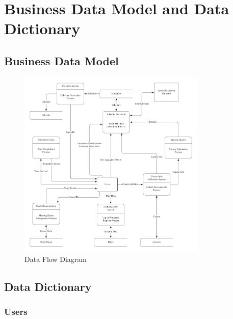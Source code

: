 \documentclass[12pt]{article}
\begin{document}
\section{Business Data Model and Data Dictionary}
\subsection{Business Data Model}
\begin{figure}[htbp]
  \centering
  \includegraphics[width=0.8\textwidth]{DFD.png}
  \caption{Data Flow Diagram} 
  \label{fig:dfd} 
\end{figure}

\subsection{Data Dictionary}
\subsubsection{Users}
\end{document}
